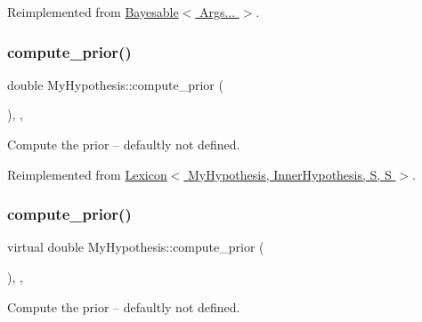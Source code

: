 Reimplemented from \hyperlink{class_bayesable_a202493156cec15937bee304d807fdbdb}{Bayesable$<$ Args... $>$}.

\mbox{\label{class_my_hypothesis_a67477313b60b21158bbfaad35dc5d275}} 
\subsubsection{\texorpdfstring{compute\+\_\+prior()}{compute\_prior()}\hspace{0.1cm}{\footnotesize\ttfamily [1/2]}}
{\footnotesize\ttfamily double My\+Hypothesis\+::compute\+\_\+prior (\begin{DoxyParamCaption}{ }\end{DoxyParamCaption})\hspace{0.3cm}{\ttfamily [inline]}, {\ttfamily [override]}, {\ttfamily [virtual]}}



Compute the prior -- defaultly not defined. 



Reimplemented from \hyperlink{class_lexicon_a2e099a68dd08d62897b40647f92eba1c}{Lexicon$<$ My\+Hypothesis, Inner\+Hypothesis, S, S $>$}.

\mbox{\label{class_my_hypothesis_ab092094c5fc31730de4f40609220bb18}} 
\subsubsection{\texorpdfstring{compute\+\_\+prior()}{compute\_prior()}\hspace{0.1cm}{\footnotesize\ttfamily [2/2]}}
{\footnotesize\ttfamily virtual double My\+Hypothesis\+::compute\+\_\+prior (\begin{DoxyParamCaption}{ }\end{DoxyParamCaption})\hspace{0.3cm}{\ttfamily [inline]}, {\ttfamily [override]}, {\ttfamily [virtual]}}



Compute the prior -- defaultly not defined. 



